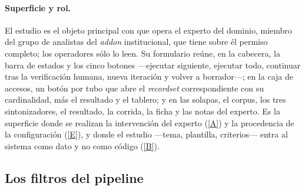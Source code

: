 \documentclass[12pt]{report}
\DeclareRobustCommand{\resp}[1]{\hyperref[tab:registro-responsabilidades]{\textcolor{respcolor}{[#1]}}}
\begin{document}
\paragraph{Superficie y rol.} El estudio es el objeto principal con que opera el experto del dominio, miembro del grupo de analistas del \textit{addon} institucional, que tiene sobre él permiso completo; los operadores sólo lo leen. Su formulario reúne, en la cabecera, la barra de estados y los cinco botones ---ejecutar siguiente, ejecutar todo, continuar tras la verificación humana, nueva iteración y volver a borrador---; en la caja de accesos, un botón por tubo que abre el \textit{recordset} correspondiente con su cardinalidad, más el resultado y el tablero; y en las solapas, el corpus, los tres sintonizadores, el resultado, la corrida, la ficha y las notas del experto. Es la superficie donde se realizan la intervención del experto (\resp{A}) y la procedencia de la configuración (\resp{E}), y donde el estudio ---tema, plantilla, criterios--- entra al sistema como dato y no como código (\resp{B}).

\subsection{Los filtros del pipeline}
\label{sec:impl-mat-filtros}
\end{document}
